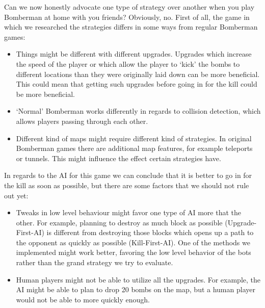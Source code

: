 %
Can we now honestly advocate one type of strategy over another when you play
Bomberman at home with you friends? Obviously, no.
First of all, the game in which we researched the strategies differs in some
ways from regular Bomberman games:
\begin{itemize}
\item Things might be different with different upgrades. Upgrades which increase
the speed of the player or which allow the player to `kick' the bombs to different
locations than they were originally laid down can be more beneficial. This could
mean that getting such upgrades before going in for the kill could be more
beneficial.
\item `Normal' Bomberman works differently in regards to collision detection,
which allows players passing through each other.
\item Different kind of maps might require different kind of strategies. In
original Bomberman games there are additional map features, for example
teleports or tunnels. This might influence the effect certain strategies have.
\end{itemize}

In regards to the AI for this game we can conclude that it is better to go in
for the kill as soon as possible, but there are some factors that we should
not rule out yet:
\begin{itemize}
\item Tweaks in low level behaviour might favor one type of AI more that the
other. For example, planning to destroy as much block as possible
(Upgrade-First-AI) is different from destroying those blocks which opens up
a path to the opponent as quickly as possible (Kill-First-AI). One of the
methods we implemented might work better, favoring the low level behavior
of the bots rather than the grand strategy we try to evaluate.
\item Human players might not be able to utilize all the upgrades. For example,
the AI might be able to plan to drop 20 bombs on the map, but a human player
would not be able to more quickly enough.
\end{itemize}
